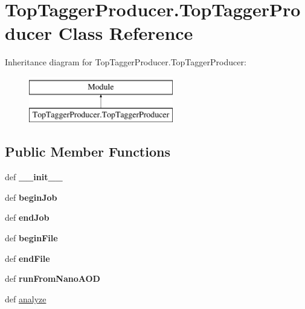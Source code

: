 \hypertarget{classTopTaggerProducer_1_1TopTaggerProducer}{\section{Top\-Tagger\-Producer.\-Top\-Tagger\-Producer Class Reference}
\label{classTopTaggerProducer_1_1TopTaggerProducer}
}
Inheritance diagram for Top\-Tagger\-Producer.\-Top\-Tagger\-Producer\-:\begin{figure}[H]
\begin{center}
\leavevmode
\includegraphics[height=2.000000cm]{classTopTaggerProducer_1_1TopTaggerProducer}
\end{center}
\end{figure}
\subsection*{Public Member Functions}
\begin{DoxyCompactItemize}
\item 
\hypertarget{classTopTaggerProducer_1_1TopTaggerProducer_a5c8f092651954386327e012eba734d20}{def {\bfseries \-\_\-\-\_\-init\-\_\-\-\_\-}}\label{classTopTaggerProducer_1_1TopTaggerProducer_a5c8f092651954386327e012eba734d20}

\item 
\hypertarget{classTopTaggerProducer_1_1TopTaggerProducer_a1d546bc8b364f136ac702cf1c784bb4f}{def {\bfseries begin\-Job}}\label{classTopTaggerProducer_1_1TopTaggerProducer_a1d546bc8b364f136ac702cf1c784bb4f}

\item 
\hypertarget{classTopTaggerProducer_1_1TopTaggerProducer_a79fe99bc2c04b09cc1a5ef9ed4aa7cc2}{def {\bfseries end\-Job}}\label{classTopTaggerProducer_1_1TopTaggerProducer_a79fe99bc2c04b09cc1a5ef9ed4aa7cc2}

\item 
\hypertarget{classTopTaggerProducer_1_1TopTaggerProducer_ab9a0f96420760a8ccd8ec514b9fbe0db}{def {\bfseries begin\-File}}\label{classTopTaggerProducer_1_1TopTaggerProducer_ab9a0f96420760a8ccd8ec514b9fbe0db}

\item 
\hypertarget{classTopTaggerProducer_1_1TopTaggerProducer_a039e05fd9e1ba5b350f58d92d4bdb77d}{def {\bfseries end\-File}}\label{classTopTaggerProducer_1_1TopTaggerProducer_a039e05fd9e1ba5b350f58d92d4bdb77d}

\item 
\hypertarget{classTopTaggerProducer_1_1TopTaggerProducer_aaaf76a9fb47e396d3028f1ef0fc44c9f}{def {\bfseries run\-From\-Nano\-A\-O\-D}}\label{classTopTaggerProducer_1_1TopTaggerProducer_aaaf76a9fb47e396d3028f1ef0fc44c9f}

\item 
def \hyperlink{classTopTaggerProducer_1_1TopTaggerProducer_a61f541cf9fa6fe2c85bef6f35d388b53}{analyze}
\end{DoxyCompactItemize}
